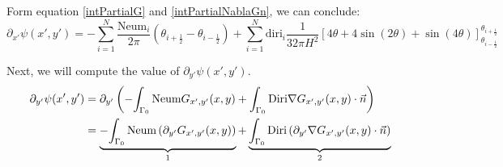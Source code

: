 \documentclass[a4paper,12pt]{article}
\newcommand{\integ}[3]{%
\ensuremath{\displaystyle{\int^{#2}_{#1} #3}}}
\begin{document}
Form equation \ref{intPartialG} and \ref{intPartialNablaGn}, we can conclude:
\begin{equation}
 \partial_{x'} \psi(x',y')=-\sum\limits_{i=1}^N \frac{\text{Neum}_i}{2\pi} \left( \theta_{i+\frac{1}{2}}- \theta_{i-\frac{1}{2}} \right)+
\sum\limits_{i=1}^N \text{diri}_i\frac{1}{32\pi H^2} \left[ 4\theta + 4 \sin(2\theta) + \sin (4\theta) \right]_{\theta_{i-\frac{1}{2}}}^{\theta_{i+\frac{1}{2}}}
\end{equation}

Next, we will compute the value of $\partial_{y'}\psi(x',y')$.
\begin{align}
 \partial_{y'}\psi(x',y')&=\partial_{y'}\left(-\integ{\Gamma_0}{}{\text{Neum}G_{x',y'}(x,y)} + \integ{\Gamma_0}{}{\text{Diri}\nabla G_{x',y'}(x,y)\cdot \vec{n}} \right)\\
&=  \underbrace{-\integ{\Gamma_0}{}{\text{Neum} \left(\partial_{y'}G_{x',y'}(x,y)\right)}}_\text{1}  +  
\underbrace{\integ{\Gamma_0}{}{\text{Diri}\left(\partial_{y'}\nabla G_{x',y'}(x,y)\cdot \vec{n}\right)}}_\text{2} 
\end{align}
\end{document}
